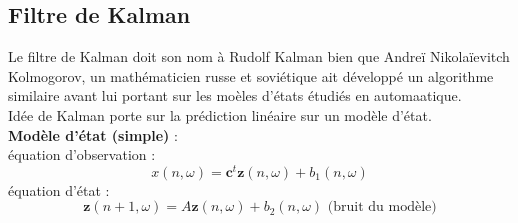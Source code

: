 \documentclass[12pt]{article}
\begin{document}
\subsection{Filtre de Kalman}
Le filtre de Kalman doit son nom à Rudolf Kalman bien que Andreï Nikolaïevitch Kolmogorov, un mathématicien russe et soviétique ait développé un algorithme similaire avant lui portant sur les moèles d'états étudiés en automaatique. \\
Idée de Kalman porte sur la prédiction linéaire sur un modèle d'état.\\

\textbf{Modèle d'état (simple)} :\\
équation d'observation :
$$x(n,\omega) = \mathbf{c}^t \mathbf{z}(n,\omega) + b_1(n,\omega)$$
équation d'état : 
$$\mathbf{z}(n+1,\omega) = A \mathbf{z}(n,\omega) + b_2(n,\omega) \text{ (bruit du modèle)}$$
\end{document}
